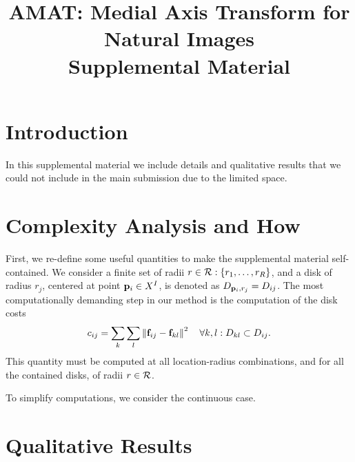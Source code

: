 \documentclass[10pt,twocolumn,letterpaper]{article}
\begin{document}
\title{AMAT: Medial Axis Transform for Natural Images \\ Supplemental Material}
\maketitle

\section{Introduction}\label{sec:introduction}
In this supplemental material we include details and qualitative results that we could not include in the main submission due to the limited space.


\section{Complexity Analysis and How}\label{sec:complexity}
First, we re-define some useful quantities to make the supplemental material self-contained.
We consider a finite set of radii $r\in \mathcal{R} : \{r_1,\ldots,r_R \}$, and a disk of radius $r_j$, centered at point $\mathbf{p}_{i}\in X^I$,
is denoted as $D_{\mathbf{p}_{i},r_j} = D_{ij}$.
The most computationally demanding step in our method is the computation of the disk costs
\begin{equation}
c_{ij} = \sum_k \sum_l \left \lVert \mathbf{f}_{ij} - \mathbf{f}_{kl}  \right \rVert^2 \quad \forall k,l: D_{kl} \subset D_{ij}.
\label{eq:diskcost}
\end{equation}
This quantity must be computed at all location-radius combinations, and for all the contained disks, of radii $r\in\mathcal{R}$.

To simplify computations, we consider the continuous case.




\section{Qualitative Results}\label{sec:qualitative}

\


{\small


}
\end{document}
